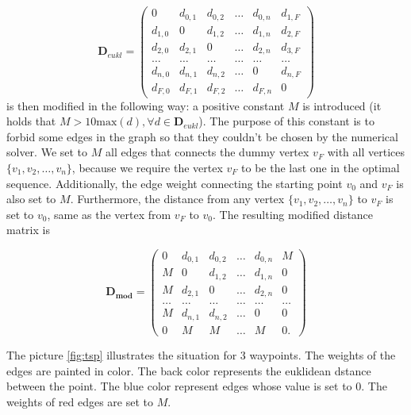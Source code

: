 \begin{equation}
  \mathbf{D}_{eukl} = 
  \begin{pmatrix}
    0 & d_{0,1} & d_{0,2} & \dots & d_{0, n} & d_{1, F} \\
    d_{1,0} & 0 & d_{1,2} & \dots & d_{1, n} & d_{2, F} \\
    d_{2,0} & d_{2,1} & 0       & \dots & d_{2, n} & d_{3, F} \\
    \dots&\dots & \dots & \dots & \dots & \dots \\
    d_{n,0}& d_{n, 1} & d_{n, 2} & \dots & 0 & d_{n, F} \\
    d_{F, 0} & d_{F,1} & d_{F,2} & \dots & d_{F, n} & 0 
\end{pmatrix}
\end{equation}
is then modified in the following way:
a positive constant $M$ is introduced (it holds that $M>10\mathrm{max}(d),  \forall d \in \mathbf{D}_{eukl}$).
The purpose of this constant is to forbid some edges in the graph so that they couldn't be chosen by the numerical solver.
We set to $M$ all edges that connects the dummy vertex $v_{F}$ with all vertices $\{v_{1},v_{2}, \dots, v_{n}\}$, because we require the vertex $v_{F}$ to be the last one in the optimal sequence.
Additionally, the edge weight connecting the starting point $v_{0}$ and $v_{F}$ is also set to $M$.
Furthermore, the distance from any vertex $\{v_{1}, v_{2}, \dots, v_{n}\}$ to $v_{F}$ is set to $v_{0}$, same as the vertex from $v_{F}$ to $v_{0}$. 
The resulting modified distance matrix is

\begin{equation}
  \mathbf{D_{mod}} = 
  \begin{pmatrix}
    0 & d_{0,1} & d_{0,2} & \dots & d_{0, n} & M \\
    M & 0 & d_{1,2} & \dots & d_{1, n} & 0 \\
    M & d_{2,1} & 0       & \dots & d_{2, n} & 0 \\
    \dots&\dots & \dots & \dots & \dots & \dots \\
    M & d_{n, 1} & d_{n, 2} & \dots & 0 & 0 \\
    0 & M & M & \dots & M & 0 .  
\end{pmatrix}
\end{equation}

The picture \ref{fig:tsp} illustrates the situation for 3 waypoints.
The weights of the edges are painted in color.
The back color represents the euklidean dstance between the point.
The blue color represent edges whose value is set to $0$.
The weights of red edges are set to $M$.

